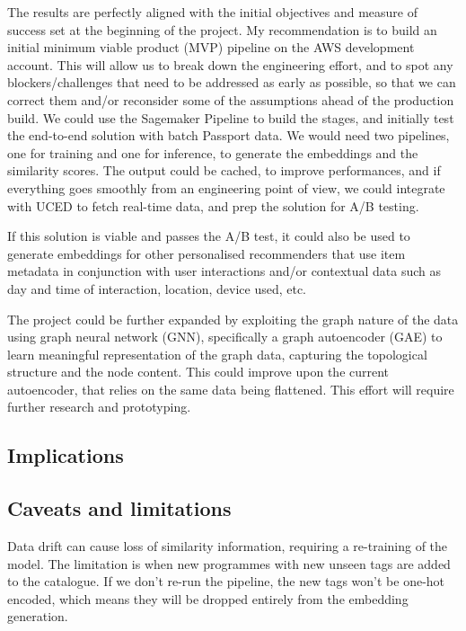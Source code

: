 The results are perfectly aligned with the initial objectives and measure of success set at the beginning of the project.
My recommendation is to build an initial minimum viable product (MVP) pipeline on the AWS development account.
This will allow us to break down the engineering effort, and to spot any blockers/challenges that need to be addressed
as early as possible, so that we can correct them and/or reconsider some of the assumptions ahead of the production build.
We could use the Sagemaker Pipeline to build the stages, and initially test the end-to-end solution with batch Passport data.
We would need two pipelines, one for training and one for inference, to generate the embeddings and the similarity scores.
The output could be cached, to improve performances, and if everything goes smoothly from an engineering point of view,
we could integrate with UCED to fetch real-time data, and prep the solution for A/B testing.

If this solution is viable and passes the A/B test, it could also be used to generate embeddings for
other personalised recommenders that use item metadata in conjunction with user interactions and/or contextual data such as
day and time of interaction, location, device used, etc.

The project could be further expanded by exploiting the graph nature of the data using graph neural network (GNN), specifically a
graph autoencoder (GAE) to learn meaningful representation of the graph data, capturing the topological structure and the node content.
This could improve upon the current autoencoder, that relies on the same data being flattened.
This effort will require further research and prototyping.

\subsection{Implications}

\subsection{Caveats and limitations}

Data drift can cause loss of similarity information, requiring a re-training of the model.
The limitation is when new programmes with new unseen tags are added to the catalogue.
If we don't re-run the pipeline, the new tags won't be one-hot encoded, which means they will be dropped entirely from the embedding generation.
